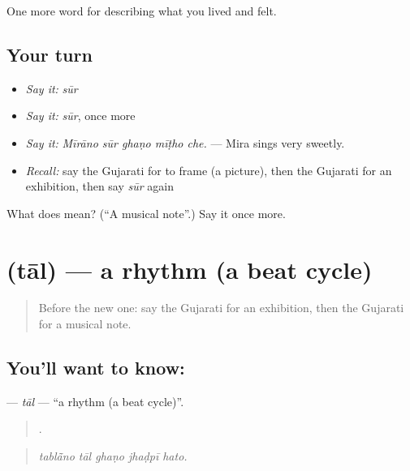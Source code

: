 \begin{grammarlens}[title={What you've built}]
One more word for describing what you lived and felt.
\end{grammarlens}

\subsection*{Your turn}
\begin{itemize}
\raggedright
  \item \emph{Say it:} \emph{sūr}
  \item \emph{Say it:} \emph{sūr}, once more
  \item \emph{Say it:} \emph{Mīrāno sūr ghaṇo mīṭho che.} — Mira sings very sweetly.
  \item \emph{Recall:} say the Gujarati for to frame (a picture), then the Gujarati for an exhibition, then say \emph{sūr} again
\end{itemize}

\begin{tcolorbox}[breakable,colback=teal!4,colframe=teal!35!black,title={Before you move on}]
What does  mean? (\textquotedblleft{}A musical note\textquotedblright{}.) Say it once more.
\end{tcolorbox}
\section[\texorpdfstring{\gu{તાલ} (tāl)}{તાલ (tāl)}]{ (tāl) — a rhythm (a beat cycle)}

\label{lesson:GU-C526-tal}



\begin{quote}
Before the new one: say the Gujarati for an exhibition, then the Gujarati for a musical note.
\end{quote}

\subsection*{You'll want to know: }
\textbf{} — \emph{tāl} — \textquotedblleft{}a rhythm (a beat cycle)\textquotedblright{}.

\begin{quote}
    .
\end{quote}

\begin{quote}
\emph{tablā̃no tāl ghaṇo jhaḍpī hato.}
\end{quote}

